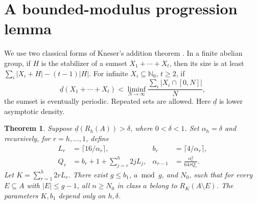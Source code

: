 \documentclass[11pt]{article}
\newtheorem{theorem}{Theorem}[section]
\theoremstyle{remark}\newtheorem{remark}[theorem]{Remark}
\newcommand{\N}{\mathbb N_0}
\newcommand{\ld}{\underline d}
\begin{document}
\section{A bounded-modulus progression lemma}
We use two classical forms of Kneser's addition theorem \cite{Kneser,CYZ}. In a finite abelian group, if $H$ is the stabilizer of a sumset $X_1+\cdots+X_t$, then its size is at least $\sum_i|X_i+H|-(t-1)|H|$. For infinite $X_i\subseteq\N$, $t\ge2$, if
\[
\ld(X_1+\cdots+X_t)<\liminf_{N\to\infty}\frac{\sum_i|X_i\cap[0,N]|}{N},
\]
the sumset is eventually periodic. Repeated sets are allowed. Here $\ld$ is lower asymptotic density.

\begin{theorem}\label{progression}
Suppose $\ld(R_h(A))>\delta$, where $0<\delta<1$. Set $\alpha_h=\delta$ and recursively, for $r=h,\ldots,1$, define
\begin{align*}
 L_r&=\lceil16/\alpha_r\rceil, & b_r&=\lceil4/\alpha_r\rceil,\\
 Q_r&=b_r+1+\sum_{j=r}^h2jL_j, & \alpha_{r-1}&=\frac{\alpha_r^2}{64rQ_r}.
\end{align*}
Let $K=\sum_{r=1}^h2rL_r$. There exist $g\le b_1$, $a\bmod g$, and $N_0$, such that for every $E\subseteq A$ with $|E|\le g-1$, all $n\ge N_0$ in class $a$ belong to $R_K(A\setminus E)$. The parameters $K,b_1$ depend only on $h,\delta$.
\end{theorem}
\end{document}
